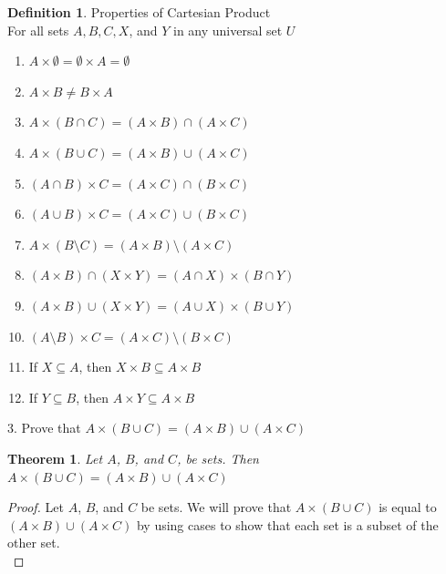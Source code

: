 \documentclass{book}
\newtheorem{theorem}{Theorem}[section]
\theoremstyle{definition}
\newtheorem{definition}{Definition}[section]
\theoremstyle{remark}
\begin{document}
\begin{definition}
Properties of Cartesian Product \\

For all sets $A, B, C, X$, and $Y$ in any universal set $U$ \\

    \begin{enumerate}
        \item $A \times \emptyset = \emptyset \times A = \emptyset$
        \item $A \times B \neq B \times A$
        \item $A \times (B \cap C) = (A \times B) \cap (A \times C)$
        \item $A \times (B \cup C) = (A \times B) \cup (A \times C)$        
        \item $(A \cap B) \times C = (A \times C) \cap (B \times C)$        
        \item $(A \cup B) \times C = (A \times C) \cup (B \times C)$ 
        \item $A \times (B \setminus C) = (A \times B) \setminus (A \times C)$            
        \item $(A \times B) \cap (X \times Y) = (A \cap X) \times (B \cap Y)$
        \item $(A \times B) \cup (X \times Y) = (A \cup X) \times (B \cup Y)$
        \item $(A \setminus B) \times C = (A \times C) \setminus (B \times C)$   
        \item If $X \subseteq A$, then $X \times B \subseteq A \times B$
        \item If $Y \subseteq B$, then $A \times Y \subseteq A \times B$
    \end{enumerate}

3. Prove that $A \times (B \cup C) = (A \times B) \cup (A \times C)$ 
    \begin{tcolorbox}
        \begin{theorem}
            Let $A$, $B$, and $C$, be sets. Then $A \times (B \cup C) = (A \times B) \cup (A \times C)$ 
        \end{theorem}
    \end{tcolorbox}
    
        \begin{proof}
            Let $A$, $B$, and $C$ be sets. We will prove that $A \times (B \cup C)$ is equal to $(A \times B) \cup (A \times C)$ by using cases to  show that each set is a subset of the other set. \\
            

\end{proof}
\end{definition}
\end{document}
